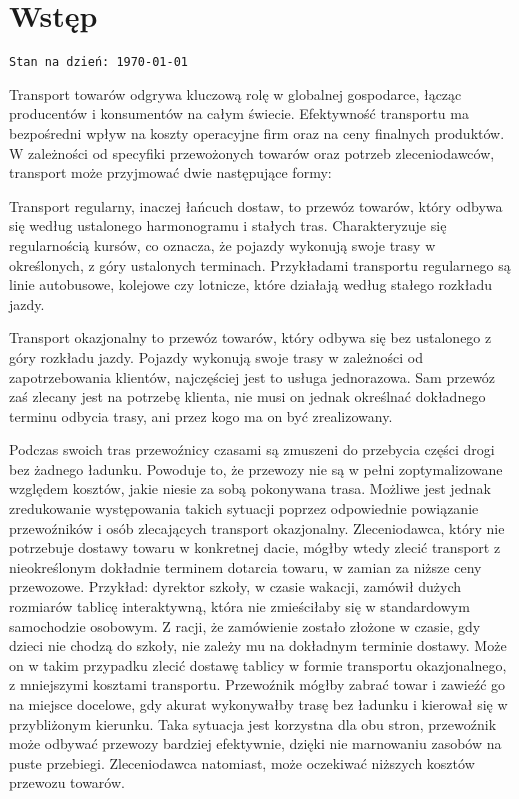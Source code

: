 \chapter{Wstęp}
\texttt{Stan na dzień: \today}

Transport towarów odgrywa kluczową rolę w globalnej gospodarce, łącząc producentów i konsumentów na całym świecie. Efektywność transportu ma bezpośredni wpływ na koszty operacyjne firm oraz na ceny finalnych produktów. W zależności od specyfiki przewożonych towarów oraz potrzeb zleceniodawców, transport może przyjmować dwie następujące formy:

\label{sec:przewoz_regularny}
Transport regularny, inaczej łańcuch dostaw, to przewóz towarów, który odbywa się według ustalonego harmonogramu i stałych tras. Charakteryzuje się regularnością kursów, co oznacza, że pojazdy wykonują swoje trasy w określonych, z góry ustalonych terminach. Przykładami transportu regularnego są linie autobusowe, kolejowe czy lotnicze, które działają według stałego rozkładu jazdy.

\label{sec:transport_okazjonalny}
Transport okazjonalny to przewóz towarów, który odbywa się bez ustalonego z góry rozkładu jazdy. Pojazdy wykonują swoje trasy w zależności od zapotrzebowania klientów, najczęściej jest to usługa jednorazowa. Sam przewóz zaś zlecany jest na potrzebę klienta, nie musi on jednak określnać dokładnego terminu odbycia trasy, ani przez kogo ma on być zrealizowany.

Podczas swoich tras przewoźnicy czasami są zmuszeni do przebycia części drogi bez żadnego ładunku. Powoduje to, że przewozy nie są w pełni zoptymalizowane względem kosztów, jakie niesie za sobą pokonywana trasa. Możliwe jest jednak zredukowanie występowania takich sytuacji poprzez odpowiednie powiązanie przewoźników i osób zlecających transport okazjonalny. Zleceniodawca, który nie potrzebuje dostawy towaru w konkretnej dacie, mógłby wtedy zlecić transport z nieokreślonym dokładnie terminem dotarcia towaru, w zamian za niższe ceny przewozowe. Przykład: dyrektor szkoły, w czasie wakacji, zamówił dużych rozmiarów tablicę interaktywną, która nie zmieściłaby się w standardowym samochodzie osobowym. Z racji, że zamówienie zostało złożone w czasie, gdy dzieci nie chodzą do szkoły, nie zależy mu na dokładnym terminie dostawy. Może on w takim przypadku zlecić dostawę tablicy w formie transportu okazjonalnego, z mniejszymi kosztami transportu. Przewoźnik mógłby zabrać towar i zawieźć go na miejsce docelowe, gdy akurat wykonywałby trasę bez ładunku i kierował się w przybliżonym kierunku. Taka sytuacja jest korzystna dla obu stron, przewoźnik może odbywać przewozy bardziej efektywnie, dzięki nie marnowaniu zasobów na puste przebiegi. Zleceniodawca natomiast, może oczekiwać niższych kosztów przewozu towarów.

